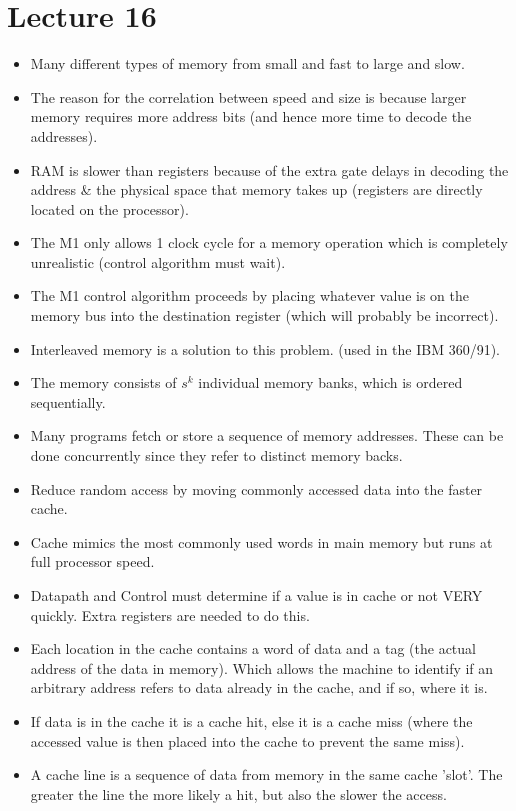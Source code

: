 \documentclass{article}
\begin{document}
\section*{Lecture 16}
\begin{itemize}
\item Many different types of memory from small and fast to large and slow.
\item The reason for the correlation between speed and size is because larger memory requires more address bits (and hence more time to decode the addresses).
\item RAM is slower than registers because of the extra gate delays in decoding the address \& the physical space that memory takes up (registers are directly located on the processor).
\item The M1 only allows 1 clock cycle for a memory operation which is completely unrealistic (control algorithm must wait).
\item The M1 control algorithm proceeds by placing whatever value is on the memory bus into the destination register (which will probably be incorrect).
\item Interleaved memory is a solution to this problem. (used in the IBM 360/91).
\item The memory consists of $s^k$ individual memory banks, which is ordered sequentially.
\item Many programs fetch or store a sequence of memory addresses. These can be done concurrently since they refer to distinct memory backs.
\item Reduce random access by moving commonly accessed data into the faster cache.
\item Cache mimics the most commonly used words in main memory but runs at full processor speed. 
\item Datapath and Control must determine if a value is in cache or not VERY quickly. Extra registers are needed to do this.
\item Each location in the cache contains a word of data and a tag (the actual address of the data in memory). Which allows the machine to identify if an arbitrary address refers to data already in the cache, and if so, where it is.
\item If data is in the cache it is a cache hit, else it is a cache miss (where the accessed value is then placed into the cache to prevent the same miss).
\item A cache line is a sequence of data from memory in the same cache 'slot'. The greater the line the more likely a hit, but also the slower the access.

\end{itemize}
\end{document}
